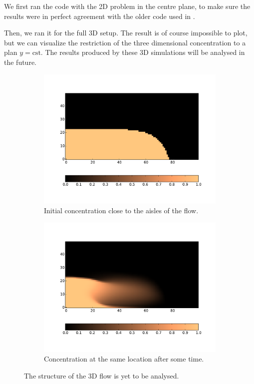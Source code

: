 We first ran the code with the 2D problem in the centre plane, to make sure the results were in perfect agreement with the older code used in \cite{main}.

Then, we ran it for the full 3D setup. 
The result is of course impossible to plot, but we can visualize the restriction of the three dimensional concentration to a plan $y=\text{cst}$.
The results produced by these 3D simulations will be analysed in the future.

\begin{figure}[hbp]
\centering
\begin{subfigure}{.5\textwidth}
  \centering
  \includegraphics[width=.8\linewidth]{vector/3Dedge0}
  \caption{Initial concentration close to the aisles of the flow.}
  \label{}
\end{subfigure}%
\begin{subfigure}{.5\textwidth}
  \centering
  \includegraphics[width=.8\linewidth]{vector/3Dedge1}
  \caption{Concentration at the same location after some time.}
  \label{}
\end{subfigure}
\caption{The structure of the 3D flow is yet to be analysed.}
\label{fig:test}
\end{figure}
